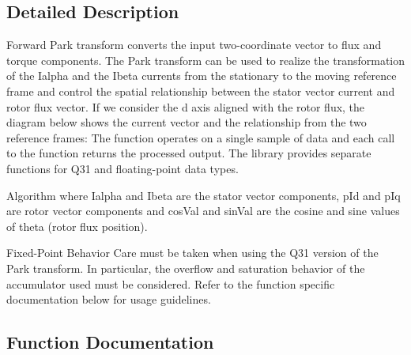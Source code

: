 \subsection{Detailed Description}
Forward Park transform converts the input two-\/coordinate vector to flux and torque components. The Park transform can be used to realize the transformation of the {\ttfamily Ialpha} and the {\ttfamily Ibeta} currents from the stationary to the moving reference frame and control the spatial relationship between the stator vector current and rotor flux vector. If we consider the d axis aligned with the rotor flux, the diagram below shows the current vector and the relationship from the two reference frames\+:  The function operates on a single sample of data and each call to the function returns the processed output. The library provides separate functions for Q31 and floating-\/point data types. \begin{DoxyParagraph}{Algorithm}
 where {\ttfamily Ialpha} and {\ttfamily Ibeta} are the stator vector components, {\ttfamily p\+Id} and {\ttfamily p\+Iq} are rotor vector components and {\ttfamily cos\+Val} and {\ttfamily sin\+Val} are the cosine and sine values of theta (rotor flux position). 
\end{DoxyParagraph}
\begin{DoxyParagraph}{Fixed-\/\+Point Behavior}
Care must be taken when using the Q31 version of the Park transform. In particular, the overflow and saturation behavior of the accumulator used must be considered. Refer to the function specific documentation below for usage guidelines. 
\end{DoxyParagraph}


\subsection{Function Documentation}
\mbox{\label{group__park_gae24bf07174d3b8dddcf30d8c8d8e7fbb}} 
